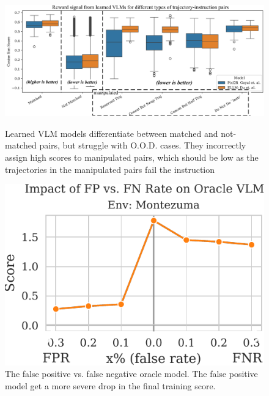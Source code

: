 \documentclass{article}
\theoremstyle{plain}
\theoremstyle{definition}
\theoremstyle{remark}
\begin{document}
\begin{figure}[b]
    \centering
    
    \begin{minipage}{0.64\textwidth}
        \centering
        \includegraphics[width=\textwidth]{figures/cosine_sim_score_offline_eval_illu.png}
        \caption{Learned VLM models differentiate between matched and not-matched pairs, but struggle with O.O.D. cases. They incorrectly assign high scores to manipulated pairs, which should be low as the trajectories in the manipulated pairs fail the instruction}
        \label{fig:cosine_sim_score_offline_eval_illu}
    \end{minipage}
    \hspace{0.1cm}
    \begin{minipage}{0.32\textwidth}
        \centering
        \includegraphics[width=\textwidth]{figures/montezuma_oracle_vlm_compare.pdf}
        \caption{The false positive vs. false negative oracle model. The false positive model get a more severe drop in the final training score.}
        \label{fig:FP_FN_comparison}
    \end{minipage}

\end{figure}
\end{document}
